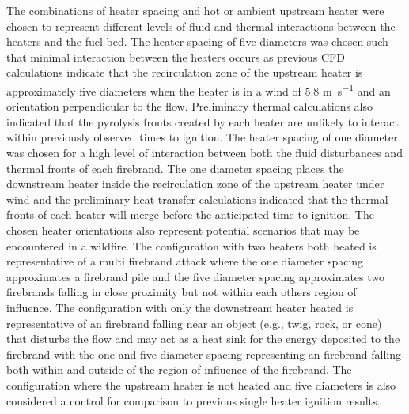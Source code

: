     The combinations of heater spacing and hot or ambient upstream heater were chosen to represent different levels of fluid and thermal interactions between the heaters and the fuel bed. The heater spacing of five diameters was chosen such that minimal interaction between the heaters occurs as previous CFD calculations indicate that the recirculation zone of the upstream heater is approximately five diameters when the heater is in a wind of 5.8 \si{\meter\per\second} and an orientation perpendicular to the flow. Preliminary thermal calculations also indicated that the pyrolysis fronts created by each heater are unlikely to interact within previously observed times to ignition. The heater spacing of one diameter was chosen for a high level of interaction between both the fluid disturbances and thermal fronts of each firebrand. The one diameter spacing places the downstream heater inside the recirculation zone of the upstream heater under wind and the preliminary heat transfer calculations indicated that the thermal fronts of each heater will merge before the anticipated time to ignition. The chosen heater orientations also represent potential scenarios that may be encountered in a wildfire. The configuration with two heaters both heated is representative of a multi firebrand attack where the one diameter spacing approximates a firebrand pile and the five diameter spacing approximates two firebrands falling in close proximity but not within each others region of influence. The configuration with only the downstream heater heated is representative of an firebrand falling near an object (e.g., twig, rock, or cone) that disturbs the flow and may act as a heat sink for the energy deposited to the firebrand with the one and five diameter spacing representing an firebrand falling both within and outside of the region of influence of the firebrand. The configuration where the upstream heater is not heated and five diameters is also considered a control for comparison to previous single heater ignition results.
    

